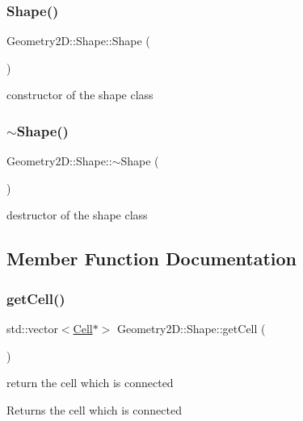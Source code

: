 \subsubsection{\texorpdfstring{Shape()}{Shape()}}
{\footnotesize\ttfamily Geometry2\+D\+::\+Shape\+::\+Shape (\begin{DoxyParamCaption}{ }\end{DoxyParamCaption})}

constructor of the shape class \mbox{\label{class_geometry2_d_1_1_shape_ad475fc843313521e75906737ecd7f459}} 
\subsubsection{\texorpdfstring{$\sim$\+Shape()}{~Shape()}}
{\footnotesize\ttfamily Geometry2\+D\+::\+Shape\+::$\sim$\+Shape (\begin{DoxyParamCaption}{ }\end{DoxyParamCaption})}

destructor of the shape class 

\subsection{Member Function Documentation}
\mbox{\label{class_geometry2_d_1_1_shape_a561811570c6e3efd024a048556ca370f}} 
\subsubsection{\texorpdfstring{get\+Cell()}{getCell()}}
{\footnotesize\ttfamily std\+::vector$<$\mbox{\hyperlink{class_cell}{Cell}}$\ast$$>$ Geometry2\+D\+::\+Shape\+::get\+Cell (\begin{DoxyParamCaption}{ }\end{DoxyParamCaption})}

return the cell which is connected \begin{DoxyReturn}{Returns}
the cell which is connected 
\end{DoxyReturn}
\mbox{\label{class_geometry2_d_1_1_shape_a25ec0d592589f6205012c84828b33fb3}} 
